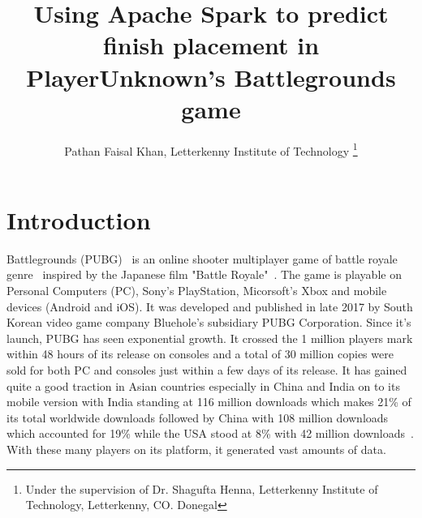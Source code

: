 \documentclass[journal,twoside,web]{ieeecolor}
\begin{document}
\title{Using Apache Spark to predict finish placement in PlayerUnknown’s Battlegrounds game}
\author{Pathan Faisal Khan, Letterkenny Institute of Technology
\thanks{Under the supervision of Dr. Shagufta Henna, Letterkenny Institute of Technology, Letterkenny, CO. Donegal}
}


\maketitle

\section{Introduction}
\label{sec:introduction}
 Battlegrounds (PUBG)~\cite{noauthor_playerunknowns_nodate} is an online shooter multiplayer game of battle royale genre~\cite{noauthor_battle_2019} inspired by the Japanese film "Battle Royale"~\cite{fukasaku_battle_2000}. The game is playable on Personal Computers (PC), Sony's PlayStation, Micorsoft's Xbox and mobile devices (Android and iOS). It was developed and published in late 2017 by South Korean video game company Bluehole's subsidiary PUBG Corporation. Since it's launch, PUBG has seen exponential growth. It crossed the 1 million players mark within 48 hours of its release on consoles and a total of 30 million copies were sold for both PC and consoles just within a few days of its release. It has gained quite a good traction in Asian countries especially in China and India on to its mobile version with India standing at 116 million downloads which makes 21\% of its total worldwide downloads followed by China with 108 million downloads which accounted for 19\% while the USA stood at 8\% with 42 million downloads~\cite{mcaloon_now_nodate}. With these many players on its platform, it generated vast amounts of data.
\end{document}
